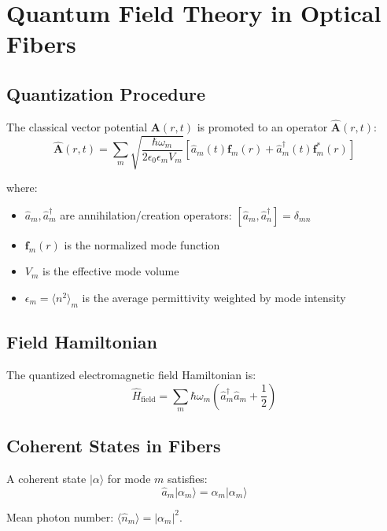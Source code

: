 \documentclass[12pt,a4paper]{article}
\begin{document}
\section{Quantum Field Theory in Optical Fibers}

\subsection{Quantization Procedure}

The classical vector potential $\mathbf{A}(r,t)$ is promoted to an operator $\hat{\mathbf{A}}(r,t)$:
\begin{equation}
\hat{\mathbf{A}}(r,t) = \sum_m \sqrt{\frac{\hbar\omega_m}{2\epsilon_0 \epsilon_m V_m}}\left[\hat{a}_m(t) \mathbf{f}_m(r) + \hat{a}_m^\dagger(t) \mathbf{f}_m^*(r)\right]
\end{equation}

where:
\begin{itemize}
\item $\hat{a}_m, \hat{a}_m^\dagger$ are annihilation/creation operators: $[\hat{a}_m, \hat{a}_n^\dagger] = \delta_{mn}$
\item $\mathbf{f}_m(r)$ is the normalized mode function
\item $V_m$ is the effective mode volume
\item $\epsilon_m = \langle n^2 \rangle_m$ is the average permittivity weighted by mode intensity
\end{itemize}

\subsection{Field Hamiltonian}

The quantized electromagnetic field Hamiltonian is:
\begin{equation}
\hat{H}_{\text{field}} = \sum_m \hbar\omega_m\left(\hat{a}_m^\dagger \hat{a}_m + \frac{1}{2}\right)
\end{equation}

\subsection{Coherent States in Fibers}

A coherent state $|\alpha\rangle$ for mode $m$ satisfies:
\begin{equation}
\hat{a}_m|\alpha_m\rangle = \alpha_m|\alpha_m\rangle
\end{equation}

Mean photon number: $\langle \hat{n}_m \rangle = |\alpha_m|^2$.
\end{document}
